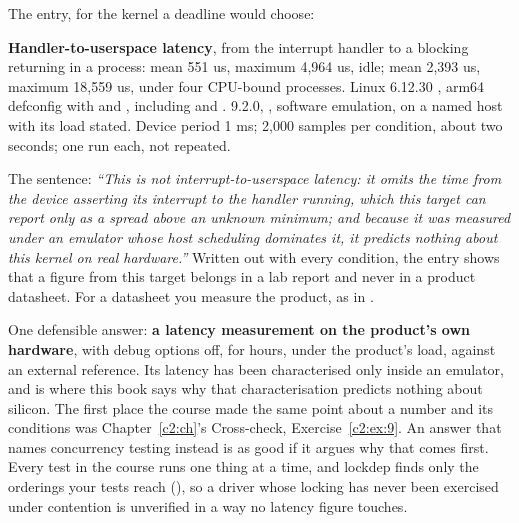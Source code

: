  The entry, for the kernel a deadline would choose:

\begin{aside}
\textbf{Handler-to-userspace latency}, from the  interrupt handler to a blocking
 returning in a  process: mean 551 us, maximum 4,964 us, idle; mean
2,393 us, maximum 18,559 us, under four CPU-bound processes. Linux 6.12.30 , arm64
defconfig with  and , including
 and .  9.2.0,
, software emulation, on a named host with its load
stated. Device period 1 ms; 2,000 samples per condition, about two seconds; one run each, not
repeated.
\end{aside}

\noindent The sentence: \emph{``This is not interrupt-to-userspace latency: it omits the time from
the device asserting its interrupt to the handler running, which this target can report only as a
spread above an unknown minimum; and because it was measured under an emulator whose host
scheduling dominates it, it predicts nothing about this kernel on real hardware.''} Written out
with every condition, the entry shows that a figure from this target belongs in a lab report and
never in a product datasheet. For a datasheet you measure the product, as in
.

 One defensible answer: \textbf{a latency measurement on the product's own hardware}, with
debug options off, for hours, under the product's load, against an external reference. Its latency
has been characterised only inside an emulator, and  is where this book says why
that characterisation predicts nothing about silicon. The first place the course made the same
point about a number and its conditions was Chapter~\ref{c2:ch}'s Cross-check,
Exercise~\ref{c2:ex:9}. An answer that names concurrency testing instead is as good if it argues
why that comes first. Every test in the course runs one thing at a time, and lockdep finds only the
orderings your tests reach (), so a driver whose locking has never been exercised
under contention is unverified in a way no latency figure touches.
